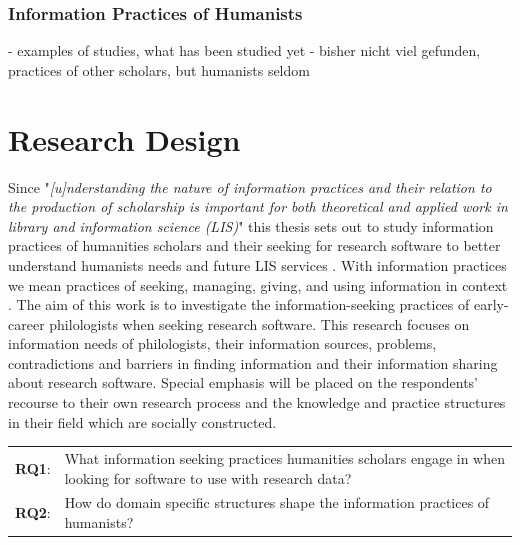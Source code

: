 \documentclass[12pt,a4paper,titlepage,oneside,abstract=true,toc=listof,toc=bibliography]{scrreprt}
\begin{document}
\subsection{Information Practices of Humanists}
- examples of studies, what has been studied yet
- bisher nicht viel gefunden, practices of other scholars, but humanists seldom
	
\chapter{Research Design}
Since "\textit{[u]nderstanding the nature of information practices and their relation to the production of scholarship is important for both theoretical and applied work in library and information science (LIS)}" \citep[p. 165]{Palmer2009} this thesis sets out to study information practices of humanities scholars and their seeking for research software to better understand humanists needs and future LIS services \citep{Case2008, Cunningham2010}. With information practices we mean practices of seeking, managing, giving, and using information in context \citep{Palmer2009}. The aim of this work is to investigate the information-seeking practices of early-career philologists when seeking research software. This research focuses on information needs of philologists, their information sources, problems, contradictions and barriers in finding information and their information sharing about research software. Special emphasis will be placed on the respondents' recourse to their own research process and the knowledge and practice structures in their field \citep{Hjorland1995} which are socially constructed.\\

\begin{tabular}{p{2cm}p{12cm}}
\textbf{RQ1}: & What information seeking practices humanities scholars engage in when looking for software to use with research data? \\ 
\textbf{RQ2}: & How do domain specific structures shape the information practices of humanists? \\ 
\end{tabular}\\ 
\end{document}
